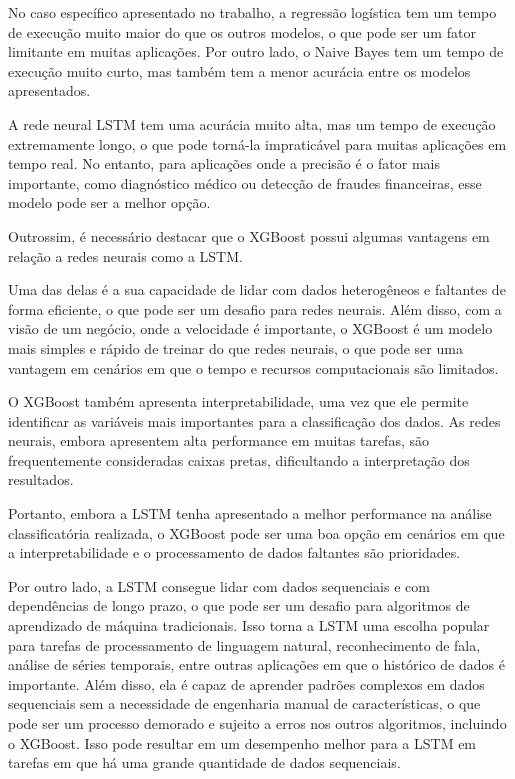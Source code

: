 No caso específico apresentado no trabalho, a regressão logística tem um tempo de execução muito maior do que os outros modelos, o que pode ser um fator limitante em muitas aplicações. Por outro lado, o Naive Bayes tem um tempo de execução muito curto, mas também tem a menor acurácia entre os modelos apresentados.

A rede neural LSTM tem uma acurácia muito alta, mas um tempo de execução extremamente longo, o que pode torná-la impraticável para muitas aplicações em tempo real. No entanto, para aplicações onde a precisão é o fator mais importante, como diagnóstico médico ou detecção de fraudes financeiras, esse modelo pode ser a melhor opção.

Outrossim, é necessário destacar que o XGBoost possui algumas vantagens em relação a redes neurais como a LSTM.

Uma das delas é a sua capacidade de lidar com dados heterogêneos e faltantes de forma eficiente, o que pode ser um desafio para redes neurais. Além disso, com a visão de um negócio, onde a velocidade é importante, o XGBoost é um modelo mais simples e rápido de treinar do que redes neurais, o que pode ser uma vantagem em cenários em que o tempo e recursos computacionais são limitados.

O XGBoost também apresenta interpretabilidade, uma vez que ele permite identificar as variáveis mais importantes para a classificação dos dados. As redes neurais, embora apresentem alta performance em muitas tarefas, são frequentemente consideradas caixas pretas, dificultando a interpretação dos resultados.

Portanto, embora a LSTM tenha apresentado a melhor performance na análise classificatória realizada, o XGBoost pode ser uma boa opção em cenários em que a interpretabilidade e o processamento de dados faltantes são prioridades.

Por outro lado, a LSTM consegue lidar com dados sequenciais e com dependências de longo prazo, o que pode ser um desafio para algoritmos de aprendizado de máquina tradicionais. Isso torna a LSTM uma escolha popular para tarefas de processamento de linguagem natural, reconhecimento de fala, análise de séries temporais, entre outras aplicações em que o histórico de dados é importante. Além disso, ela é capaz de aprender padrões complexos em dados sequenciais sem a necessidade de engenharia manual de características, o que pode ser um processo demorado e sujeito a erros nos outros algoritmos, incluindo o XGBoost. Isso pode resultar em um desempenho melhor para a LSTM em tarefas em que há uma grande quantidade de dados sequenciais.

